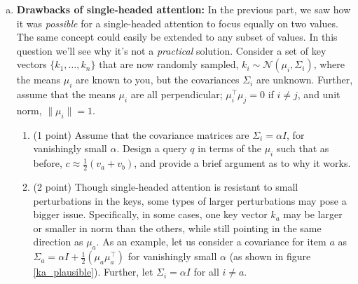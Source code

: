 \begin{enumerate}[(a)]
\begin{answer}
\end{answer}


\item {}  \textbf{Drawbacks of single-headed attention:} \label{q_problem_with_single_head}
In the previous part, we saw how it was \textit{possible} for a single-headed attention to focus equally on two values.
The same concept could easily be extended to any subset of values.
In this question we'll see why it's not a \textit{practical} solution.
Consider a set of key vectors $\{k_1,\dots,k_n\}$ that are now randomly sampled, $k_i\sim \mathcal{N}(\mu_i, \Sigma_i)$, where the means $\mu_i$ are known to you, but the covariances $\Sigma_i$ are unknown.
Further, assume that the means $\mu_i$ are all perpendicular; $\mu_i^\top \mu_j = 0$ if $i\not=j$, and unit norm, $\|\mu_i\|=1$.

    \begin{enumerate}[label=\roman*.]
    \item (1 point) Assume that the covariance matrices are $\Sigma_i = \alpha I$, for vanishingly small $\alpha$.
    Design a query $q$ in terms of the $\mu_i$ such that as before, $c\approx \frac{1}{2}(v_a + v_b)$, and provide a brief argument as to why it works.

    \begin{answer}
    \end{answer}


    \item (2 point) Though single-headed attention is resistant to small perturbations in the keys, some types of larger perturbations may pose a bigger issue. Specifically, in some cases, one key vector $k_a$ may be larger or smaller in norm than the others, while still pointing in the same direction as $\mu_a$. As an example, let us consider a covariance for item $a$ as $\Sigma_a = \alpha I + \frac{1}{2}(\mu_a\mu_a^\top)$ for vanishingly small $\alpha$ (as shown in figure \ref{ka_plausible}).
    Further, let $\Sigma_i = \alpha I$ for all $i \neq a$. %


\end{enumerate}
\end{enumerate}
